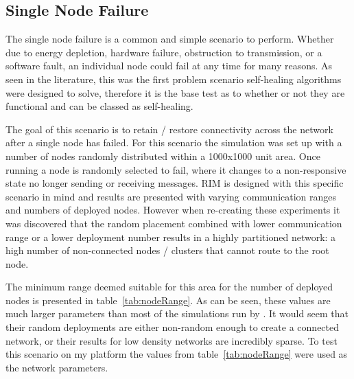 \documentclass[authoryearcitations]{UoYCSproject}
\begin{document}
\subsection{Single Node Failure}

The single node failure is a common and simple scenario to perform. Whether due to energy depletion, hardware failure, obstruction to transmission, or a software fault, an individual node could fail at any time for many reasons. As seen in the literature, this was the first problem scenario self-healing algorithms were designed to solve, therefore it is the base test as to whether or not they are functional and can be classed as self-healing.

The goal of this scenario is to retain / restore connectivity across the network after a single node has failed. For this scenario the simulation was set up with a number of nodes randomly distributed within a 1000x1000 unit area. Once running a node is randomly selected to fail, where it changes to a non-responsive state no longer sending or receiving messages. RIM is designed with this specific scenario in mind and results are presented with varying communication ranges and numbers of deployed nodes. However when re-creating these experiments it was discovered that the random placement combined with lower communication range or a lower deployment number results in a highly partitioned network: a high number of non-connected nodes / clusters that cannot route to the root node.

\begin{table}[]
\centering
{}
\caption{Minimum ranges for number of randomly deployed nodes in a 1000x1000 unit area.}
\label{tab:nodeRange}
\end{table}

The minimum range deemed suitable for this area for the number of deployed nodes is presented in table~\ref{tab:nodeRange}. As can be seen, these values are much larger parameters than most of the simulations run by \citeauthor*{Younis2010}. It would seem that their random deployments are either non-random enough to create a connected network, or their results for low density networks are incredibly sparse. To test this scenario on my platform the values from table~\ref{tab:nodeRange} were used as the network parameters.
\end{document}

